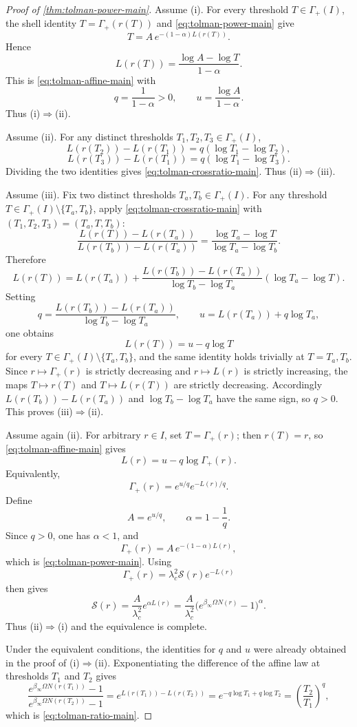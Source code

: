 \begin{proof}[Proof of \cref{thm:tolman-power-main}]
Assume \textup{(i)}. For every threshold $T\in\Gamma_+(I)$, the shell identity $T=\Gamma_+(r(T))$ and \eqref{eq:tolman-power-main} give
\[
T=A\,e^{-(1-\alpha)L(r(T))}.
\]
Hence
\[
L(r(T))
=
\frac{\log A-\log T}{1-\alpha}.
\]
This is \eqref{eq:tolman-affine-main} with
\[
q=\frac{1}{1-\alpha}>0,
\qquad
u=\frac{\log A}{1-\alpha}.
\]
Thus \textup{(i)}$\Rightarrow$\textup{(ii)}.

Assume \textup{(ii)}. For any distinct thresholds $T_1,T_2,T_3\in\Gamma_+(I)$,
\[
L(r(T_2))-L(r(T_1))
=
q(\log T_1-\log T_2),
\]
\[
L(r(T_3))-L(r(T_1))
=
q(\log T_1-\log T_3).
\]
Dividing the two identities gives \eqref{eq:tolman-crossratio-main}. Thus \textup{(ii)}$\Rightarrow$\textup{(iii)}.

Assume \textup{(iii)}. Fix two distinct thresholds $T_a,T_b\in\Gamma_+(I)$. For any threshold $T\in\Gamma_+(I)\setminus\{T_a,T_b\}$, apply \eqref{eq:tolman-crossratio-main} with $(T_1,T_2,T_3)=(T_a,T,T_b)$:
\[
\frac{L(r(T))-L(r(T_a))}{L(r(T_b))-L(r(T_a))}
=
\frac{\log T_a-\log T}{\log T_a-\log T_b}.
\]
Therefore
\[
L(r(T))
=
L(r(T_a))
+
\frac{L(r(T_b))-L(r(T_a))}{\log T_b-\log T_a}
(\log T_a-\log T).
\]
Setting
\[
q=
\frac{L(r(T_b))-L(r(T_a))}{\log T_b-\log T_a},
\qquad
u=L(r(T_a))+q\log T_a,
\]
one obtains
\[
L(r(T))=u-q\log T
\]
for every $T\in\Gamma_+(I)\setminus\{T_a,T_b\}$, and the same identity holds trivially at $T=T_a,T_b$. Since $r\mapsto\Gamma_+(r)$ is strictly decreasing and $r\mapsto L(r)$ is strictly increasing, the maps $T\mapsto r(T)$ and $T\mapsto L(r(T))$ are strictly decreasing. Accordingly $L(r(T_b))-L(r(T_a))$ and $\log T_b-\log T_a$ have the same sign, so $q>0$. This proves \textup{(iii)}$\Rightarrow$\textup{(ii)}.

Assume again \textup{(ii)}. For arbitrary $r\in I$, set $T=\Gamma_+(r)$; then $r(T)=r$, so \eqref{eq:tolman-affine-main} gives
\[
L(r)=u-q\log\Gamma_+(r).
\]
Equivalently,
\[
\Gamma_+(r)=e^{u/q}e^{-L(r)/q}.
\]
Define
\[
A=e^{u/q},
\qquad
\alpha=1-\frac{1}{q}.
\]
Since $q>0$, one has $\alpha<1$, and
\[
\Gamma_+(r)=A\,e^{-(1-\alpha)L(r)},
\]
which is \eqref{eq:tolman-power-main}. Using
\[
\Gamma_+(r)=\lambda_c^2\mathcal S(r)e^{-L(r)}
\]
then gives
\[
\mathcal S(r)=\frac{A}{\lambda_c^2}e^{\alpha L(r)}
=
\frac{A}{\lambda_c^2}\bigl(e^{\beta_\infty\Omega N(r)}-1\bigr)^\alpha.
\]
Thus \textup{(ii)}$\Rightarrow$\textup{(i)} and the equivalence is complete.

Under the equivalent conditions, the identities for $q$ and $u$ were already obtained in the proof of \textup{(i)}$\Rightarrow$\textup{(ii)}. Exponentiating the difference of the affine law at thresholds $T_1$ and $T_2$ gives
\[
\frac{e^{\beta_\infty\Omega N(r(T_1))}-1}
     {e^{\beta_\infty\Omega N(r(T_2))}-1}
=
e^{L(r(T_1))-L(r(T_2))}
=
e^{-q\log T_1+q\log T_2}
=
\left(\frac{T_2}{T_1}\right)^q,
\]
which is \eqref{eq:tolman-ratio-main}.


\end{proof}
